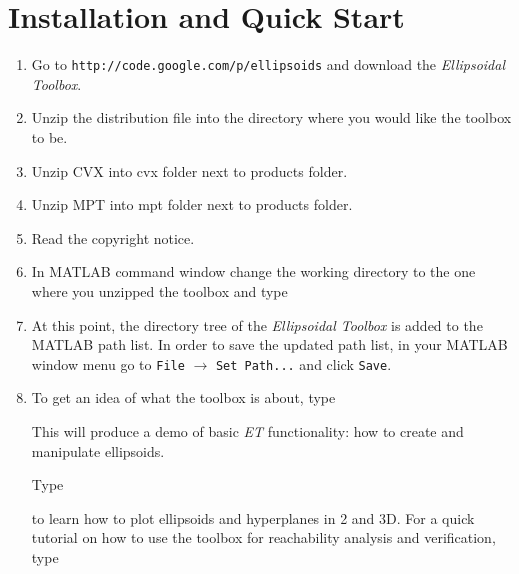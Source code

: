 \section{Installation and Quick Start}
\begin{enumerate}
\item Go to
\newline
{\tt http://code.google.com/p/ellipsoids}
\newline
and download the {\it Ellipsoidal Toolbox}.
\item Unzip the distribution file into the directory where you would like
the toolbox to be.
\item Unzip CVX into cvx folder next to products folder.
\item Unzip MPT into mpt folder next to products folder.
\item Read the copyright notice.
\item In MATLAB command window change the working directory to the one where
you unzipped the toolbox and type
\item At this point, the directory tree of the {\it Ellipsoidal Toolbox} is
added to the MATLAB path list. In order to save the updated path list,
in your MATLAB window menu go to {\tt File} $\rightarrow$ {\tt Set Path...} and
click {\tt Save}.
\item To get an idea of what the toolbox is about, type

This will produce a demo of basic {\it ET} functionality: how to create
and manipulate ellipsoids.

Type

to learn how to plot ellipsoids and hyperplanes in 2 and 3D.
\newline
For a quick tutorial on how to use the toolbox for reachability analysis
and verification, type

\end{enumerate}

